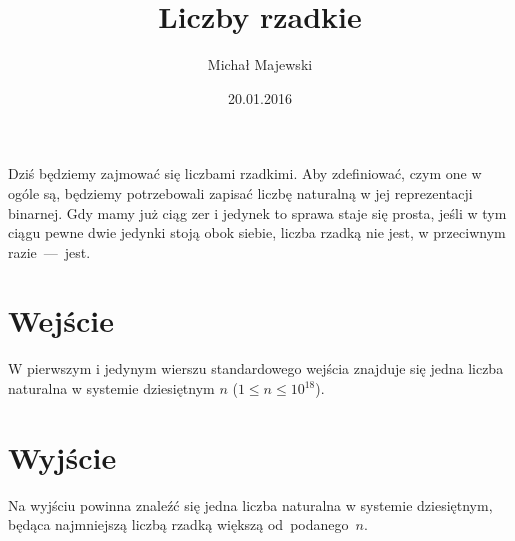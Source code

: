 \documentclass[zad,zawodnik,utf8]{sinol}
\title{Liczby rzadkie}
\author{Michał Majewski} %
\date{20.01.2016}
\begin{document}
  \begin{tasktext}%
Dzi\'s b\k{e}dziemy zajmowa\'c si\k{e} liczbami rzadkimi. Aby zdefiniowa\'c, czym one w og\'ole s\k{a}, b\k{e}dziemy potrzebowali zapisa\'c liczb\k{e} naturaln\k{a} w jej reprezentacji binarnej. Gdy mamy ju\.z ci\k{a}g zer i jedynek to sprawa staje si\k{e} prosta, je\'sli w tym ci\k{a}gu pewne dwie jedynki stoj\k{a} obok siebie, liczba rzadk\k{a} nie jest, w przeciwnym razie~---~jest.

  \section{Wej\'scie}
W pierwszym i jedynym wierszu standardowego wej\'scia znajduje si\k{e} jedna liczba naturalna w systemie dziesi\k{e}tnym $n$ ($1 \leq n \leq 10^{18}$).

  \section{Wyj\'scie}

Na wyj\'sciu powinna znale\'z\'c si\k{e} jedna liczba naturalna w systemie dziesi\k{e}tnym, b\k{e}d\k{a}ca najmniejsz\k{a} liczb\k{a} rzadk\k{a} wi\k{e}ksz\k{a} od~podanego~$n$.
     \makecompactexample    
   
\medskip
\noindent

  \end{tasktext}
\end{document}
